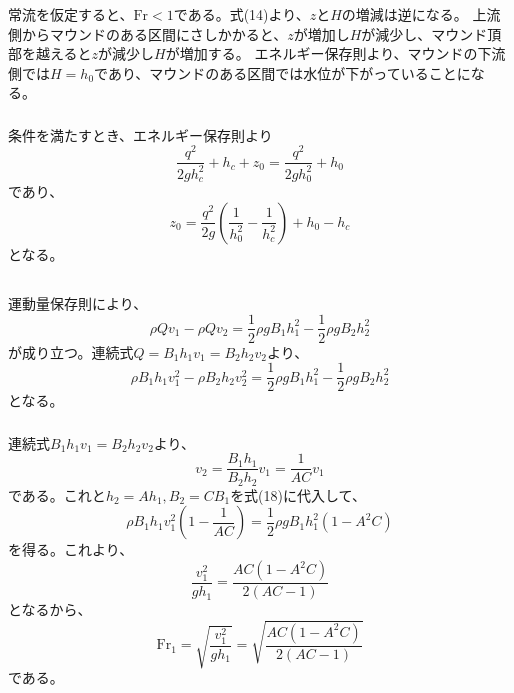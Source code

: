 \documentclass[a4paper]{jsarticle}
\begin{document}
\subsubsection{}
常流を仮定すると、$\mathrm{Fr} < 1$である。式(14)より、$z$と$H$の増減は逆になる。
上流側からマウンドのある区間にさしかかると、$z$が増加し$H$が減少し、マウンド頂部を越えると$z$が減少し$H$が増加する。
エネルギー保存則より、マウンドの下流側では$H = h_0$であり、マウンドのある区間では水位が下がっていることになる。

\subsubsection{}
条件を満たすとき、エネルギー保存則より
\begin{equation}
  \frac{q^2}{2g h_c^2} + h_c + z_0 = \frac{q^2}{2g h_0^2} + h_0
\end{equation}
であり、
\begin{equation}
  z_0 = \frac{q^2}{2g} \left(\frac{1}{h_0^2} - \frac{1}{h_c^2}\right) + h_0 - h_c
\end{equation}
となる。

\subsection{}
\subsubsection{}
運動量保存則により、
\begin{equation}
  \rho Q v_1 - \rho Q v_2 = \frac{1}{2} \rho g B_1 h_1^2 - \frac{1}{2} \rho g B_2 h_2^2
\end{equation}
が成り立つ。連続式$Q = B_1 h_1 v_1 = B_2 h_2 v_2$より、
\begin{equation}
  \rho B_1 h_1 v_1^2 - \rho B_2 h_2 v_2^2 = \frac{1}{2} \rho g B_1 h_1^2 - \frac{1}{2} \rho g B_2 h_2^2
\end{equation}
となる。

\subsubsection{}
連続式$B_1 h_1 v_1 = B_2 h_2 v_2$より、
\begin{equation}
  v_2 = \frac{B_1 h_1}{B_2 h_2} v_1 = \frac{1}{A C} v_1
\end{equation}
である。これと$h_2 = A h_1, B_2 = C B_1$を式(18)に代入して、
\begin{equation}
  \rho B_1 h_1 v_1^2 \left(1 - \frac{1}{A C}\right)
  = \frac{1}{2} \rho g B_1 h_1^2 (1 - A^2 C)
\end{equation}
を得る。これより、
\begin{equation}
  \frac{v_1^2}{g h_1} = \frac{A C (1 - A^2 C)}{2 (A C - 1)}
\end{equation}
となるから、
\begin{equation}
  \mathrm{Fr}_1 = \sqrt{\frac{v_1^2}{g h_1}} = \sqrt{\frac{A C (1 - A^2 C)}{2 (A C - 1)}}
\end{equation}
である。
\end{document}
